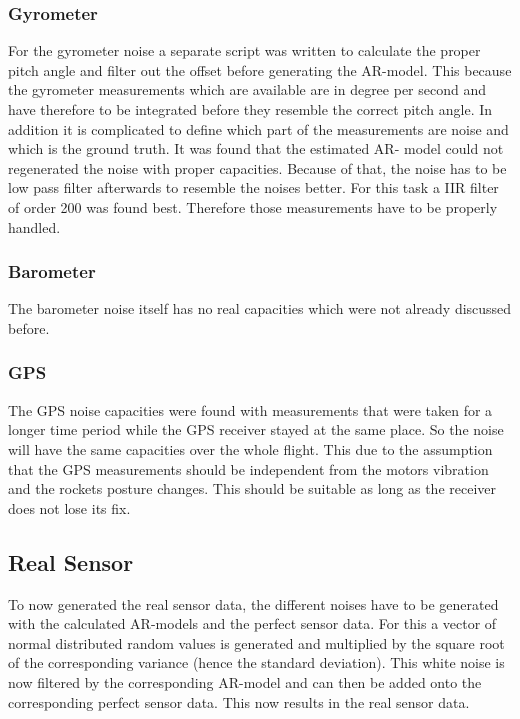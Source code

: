 \subsubsection{Gyrometer}
For the gyrometer noise a separate script was written to calculate the proper pitch angle and filter out the offset before generating the AR-model.
This because the gyrometer measurements which are available are in degree per second
and have therefore to be integrated before they resemble the correct pitch angle.
In addition it is complicated to define which part of the measurements are noise and which is the ground truth.
It was found that the estimated AR- model could not regenerated the noise with proper capacities.
Because of that, the noise has to be low pass filter afterwards to resemble the noises better.
For this task a IIR filter of order 200 was found best.
Therefore those measurements have to be properly handled.

\subsubsection{Barometer}
The barometer noise itself has no real capacities which were not already discussed before.

\subsubsection{GPS}
The GPS noise capacities were found with measurements that were taken for a longer time period while the GPS receiver stayed at the same place.
So the noise will have the same capacities over the whole flight.
This due to the assumption that the GPS measurements should be independent from the motors vibration and the rockets posture changes.
This should be suitable as long as the receiver does not lose its fix.

\newpage
\subsection{Real Sensor}
To now generated the real sensor data, the different noises have to be generated with the calculated AR-models and the perfect sensor data.
For this a vector of normal distributed random values is generated and multiplied by the square root of the corresponding variance (hence the standard deviation).
This white noise is now filtered by the corresponding AR-model and can then be added onto the corresponding perfect sensor data.
This now results in the real sensor data.

